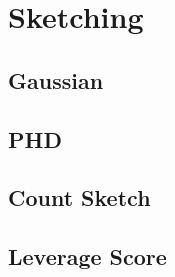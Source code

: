 \section{Sketching}

\subsection{Gaussian}


\subsection{PHD}


\subsection{Count Sketch}


\subsection{Leverage Score}

